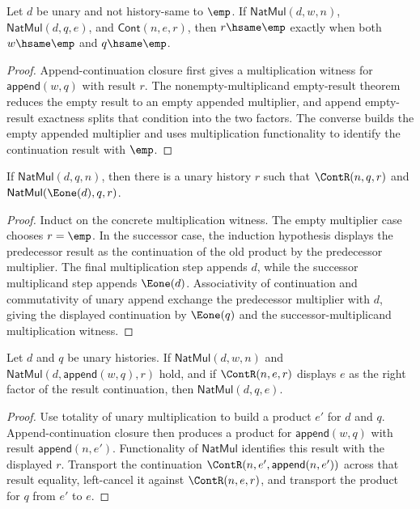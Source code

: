 \begin{theorem}
\label{thm:natmul-append-cont-empty-result-empty-factors-iff}
Let \(d\) be unary and not history-same to \(\emp\). If
\(\mathsf{NatMul}(d,w,n)\), \(\mathsf{NatMul}(d,q,e)\), and
\(\mathsf{Cont}(n,e,r)\), then \(r\hsame\emp\) exactly when both
\(w\hsame\emp\) and \(q\hsame\emp\).
\end{theorem}
\begin{proof}
Append-continuation closure first gives a multiplication witness for
\(\mathsf{append}(w,q)\) with result \(r\). The nonempty-multiplicand
empty-result theorem reduces the empty result to an empty appended multiplier,
and append empty-result exactness splits that condition into the two factors.
The converse builds the empty appended multiplier and uses multiplication
functionality to identify the continuation result with \(\emp\).
\end{proof}

\begin{theorem}
\label{thm:natmul-succ-multiplicand-append-multiplier-total}
If $\mathsf{NatMul}(d,q,n)$, then there is a unary history $r$ such that
$\ContR(n,q,r)$ and
$\mathsf{NatMul}(\Eone(d),q,r)$.
\end{theorem}
\begin{proof}
Induct on the concrete multiplication witness. The empty multiplier case
chooses $r=\emp$. In the successor case, the induction hypothesis displays
the predecessor result as the continuation of the old product by the
predecessor multiplier. The final multiplication step appends $d$, while the
successor multiplicand step appends $\Eone(d)$. Associativity of
continuation and commutativity of unary append exchange the predecessor
multiplier with $d$, giving the displayed continuation by $\Eone(q)$ and the
successor-multiplicand multiplication witness.
\end{proof}

\begin{lemma}
\label{lem:nat-mul-append-multiplier-right-factor}
Let $d$ and $q$ be unary histories. If $\mathsf{NatMul}(d,w,n)$ and
$\mathsf{NatMul}(d,\mathsf{append}(w,q),r)$ hold, and if $\ContR(n,e,r)$
displays $e$ as the right factor of the result continuation, then
$\mathsf{NatMul}(d,q,e)$.
\end{lemma}
\begin{proof}
Use totality of unary multiplication to build a product $e'$ for $d$ and $q$.
Append-continuation closure then produces a product for
$\mathsf{append}(w,q)$ with result $\mathsf{append}(n,e')$. Functionality of
$\mathsf{NatMul}$ identifies this result with the displayed $r$. Transport the
continuation $\ContR(n,e',\mathsf{append}(n,e'))$ across that result equality,
left-cancel it against $\ContR(n,e,r)$, and transport the product for $q$ from
$e'$ to $e$.
\end{proof}

